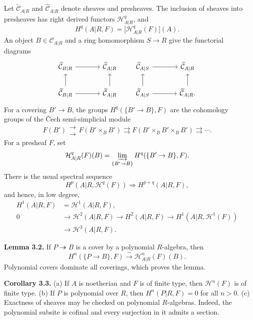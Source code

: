 \documentclass[11pt]{article}
\providecommand{\cC}{\mathcal C}
\providecommand{\cH}{\mathcal H}
\begin{document}
Let \(\widetilde{\cC}_{A|R}\) and \(\widehat{\cC}_{A|R}\) denote sheaves and presheaves.  The inclusion of sheaves into presheaves has right derived functors \(\cH^q_{A|R}\), and
\[
 H^q(A|R,F)=\bigl[\cH^q_{A|R}(F)\bigr](A).
\]
An object \(B\in\cC_{A|R}\) and a ring homomorphism \(S\to R\) give the functorial diagrams
\[
\begin{tikzcd}[column sep=large]
\widehat{\cC}_{B|R} \arrow[r] & \widehat{\cC}_{A|R} \\
\widetilde{\cC}_{B|R} \arrow[u] \arrow[r] & \widetilde{\cC}_{A|R} \arrow[u]
\end{tikzcd}
\qquad
\begin{tikzcd}[column sep=large]
\widehat{\cC}_{A|S} \arrow[r] & \widehat{\cC}_{A|R} \\
\widetilde{\cC}_{A|S} \arrow[u] \arrow[r] & \widetilde{\cC}_{A|R} \arrow[u].
\end{tikzcd}
\]
For a covering \(B'\to B\), the groups \(H^q(\{B'\to B\},F)\) are the cohomology groups of the Čech semi-simplicial module
\[
F(B')\mathrel{\substack{\longrightarrow\\[-.6ex]\longrightarrow}} F(B'\times_BB')\rightrightarrows F(B'\times_BB'\times_BB')\rightrightarrows\cdots .
\]
For a presheaf \(F\), set
\[
\cH^q_{A|R}(F)(B)=\varinjlim_{\{B'\to B\}}H^q(\{B'\to B\},F).
\]
There is the usual spectral sequence
\[
H^p(A|R,\cH^q(F))\Rightarrow H^{p+q}(A|R,F),
\]
and hence, in low degree,
\[
\begin{aligned}
H^1(A|R,F)&=\cH^1(A|R,F),\\
0&\to\cH^2(A|R,F)\to H^2(A|R,F)\to H^1(A|R,\cH^1(F))\\
 &\to\cH^3(A|R,F).
\end{aligned}
\]

\textbf{Lemma 3.2.}  If \(P\twoheadrightarrow B\) is a cover by a polynomial \(R\)-algebra, then
\[
H^n(\{P\to B\},F)\xrightarrow{\sim}\cH^n_{A|R}(F)(B).
\]
Polynomial covers dominate all coverings, which proves the lemma.

\textbf{Corollary 3.3.}  (a) If \(A\) is noetherian and \(F\) is of finite type, then \(\cH^n(F)\) is of finite type.  (b) If \(P\) is polynomial over \(R\), then \(H^n(P|R,F)=0\) for all \(n>0\).  (c) Exactness of sheaves may be checked on polynomial \(R\)-algebras.  Indeed, the polynomial subsite is cofinal and every surjection in it admits a section.
\end{document}
